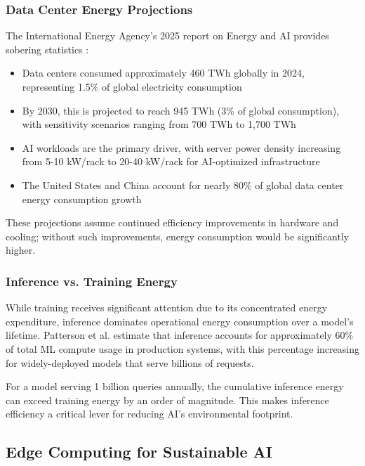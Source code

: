 \documentclass[11pt,a4paper]{article}
\begin{document}
\subsubsection{Data Center Energy Projections}

The International Energy Agency's 2025 report on Energy and AI provides sobering statistics \cite{iea2025energyai}:

\begin{itemize}[leftmargin=*,nosep]
    \item Data centers consumed approximately 460 TWh globally in 2024, representing 1.5\% of global electricity consumption
    \item By 2030, this is projected to reach 945 TWh (3\% of global consumption), with sensitivity scenarios ranging from 700 TWh to 1,700 TWh
    \item AI workloads are the primary driver, with server power density increasing from 5-10 kW/rack to 20-40 kW/rack for AI-optimized infrastructure
    \item The United States and China account for nearly 80\% of global data center energy consumption growth
\end{itemize}

These projections assume continued efficiency improvements in hardware and cooling; without such improvements, energy consumption would be significantly higher.

\subsubsection{Inference vs. Training Energy}

While training receives significant attention due to its concentrated energy expenditure, inference dominates operational energy consumption over a model's lifetime. Patterson et al. \cite{patterson2021carbon} estimate that inference accounts for approximately 60\% of total ML compute usage in production systems, with this percentage increasing for widely-deployed models that serve billions of requests.

For a model serving 1 billion queries annually, the cumulative inference energy can exceed training energy by an order of magnitude. This makes inference efficiency a critical lever for reducing AI's environmental footprint.

\subsection{Edge Computing for Sustainable AI}
\end{document}
